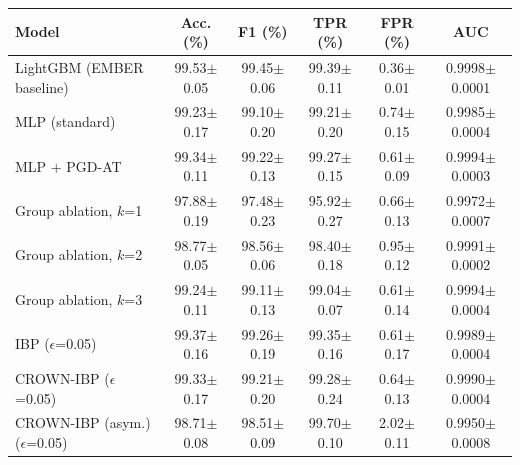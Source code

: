 \begin{tabular}{lccccc}
\toprule
Model & Acc. (\%) & F1 (\%) & TPR (\%) & FPR (\%) & AUC \\
\midrule
LightGBM (EMBER baseline) & 99.53$\pm$0.05 & 99.45$\pm$0.06 & 99.39$\pm$0.11 & 0.36$\pm$0.01 & 0.9998$\pm$0.0001 \\
MLP (standard) & 99.23$\pm$0.17 & 99.10$\pm$0.20 & 99.21$\pm$0.20 & 0.74$\pm$0.15 & 0.9985$\pm$0.0004 \\
MLP + PGD-AT & 99.34$\pm$0.11 & 99.22$\pm$0.13 & 99.27$\pm$0.15 & 0.61$\pm$0.09 & 0.9994$\pm$0.0003 \\
Group ablation, $k$=1 & 97.88$\pm$0.19 & 97.48$\pm$0.23 & 95.92$\pm$0.27 & 0.66$\pm$0.13 & 0.9972$\pm$0.0007 \\
Group ablation, $k$=2 & 98.77$\pm$0.05 & 98.56$\pm$0.06 & 98.40$\pm$0.18 & 0.95$\pm$0.12 & 0.9991$\pm$0.0002 \\
Group ablation, $k$=3 & 99.24$\pm$0.11 & 99.11$\pm$0.13 & 99.04$\pm$0.07 & 0.61$\pm$0.14 & 0.9994$\pm$0.0004 \\
IBP ($\epsilon$=0.05) & 99.37$\pm$0.16 & 99.26$\pm$0.19 & 99.35$\pm$0.16 & 0.61$\pm$0.17 & 0.9989$\pm$0.0004 \\
CROWN-IBP ($\epsilon$=0.05) & 99.33$\pm$0.17 & 99.21$\pm$0.20 & 99.28$\pm$0.24 & 0.64$\pm$0.13 & 0.9990$\pm$0.0004 \\
CROWN-IBP (asym.) ($\epsilon$=0.05) & 98.71$\pm$0.08 & 98.51$\pm$0.09 & 99.70$\pm$0.10 & 2.02$\pm$0.11 & 0.9950$\pm$0.0008 \\
\bottomrule
\end{tabular}